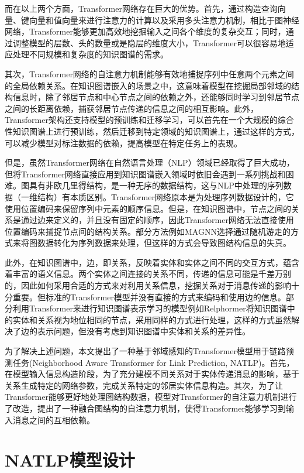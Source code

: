 而在以上两个方面，Transformer网络存在巨大的优势。首先，通过构造查询向量、键向量和值向量来进行注意力的计算以及采用多头注意力机制，相比于图神经网络，Transformer能够更加高效地挖掘输入之间各个维度的复杂交互；同时，通过调整模型的层数、头的数量或是隐层的维度大小，Transformer可以很容易地适应处理不同规模和复杂度的知识图谱的需求。

其次，Transformer网络的自注意力机制能够有效地捕捉序列中任意两个元素之间的全局依赖关系。在知识图谱嵌入的场景之中，这意味着模型在挖掘局部邻域的结构信息时，除了邻居节点和中心节点之间的依赖之外，还能够同时学习到邻居节点之间的长距离依赖，捕获邻居节点传递的信息之间的相互影响。此外，Transformer架构还支持模型的预训练和迁移学习，可以首先在一个大规模的综合性知识图谱上进行预训练，然后迁移到特定领域的知识图谱上，通过这样的方式，可以减少模型对标注数据的依赖，提高模型在特定任务上的表现。

但是，虽然Transformer网络在自然语言处理（NLP）领域已经取得了巨大成功，但将Transformer网络直接应用到知识图谱嵌入领域时依旧会遇到一系列挑战和困难。图具有非欧几里得结构，是一种无序的数据结构，这与NLP中处理的序列数据（一维结构）有本质区别。Transformer网络原本是为处理序列数据设计的，它使用位置编码来保留序列中元素的顺序信息。但是，在知识图谱中，节点之间的关系是通过边来定义的，并且没有固定的顺序，因此Transformer网络无法直接使用位置编码来捕捉节点间的结构关系。部分方法例如MAGNN选择通过随机游走的方式来将图数据转化为序列数据来处理，但这样的方式会导致图结构信息的失真。

此外，在知识图谱中，边，即关系，反映着实体和实体之间不同的交互方式，蕴含着丰富的语义信息。两个实体之间连接的关系不同，传递的信息可能是千差万别的，因此如何采用合适的方式来对利用关系信息，挖掘关系对于消息传递的影响十分重要。但标准的Transformer模型并没有直接的方式来编码和使用边的信息。部分利用Transformer来进行知识图谱表示学习的模型例如Relphormer将知识图谱中的实体和关系视为地位相同的节点，采用同样的方式进行处理，这样的方式虽然解决了边的表示问题，但没有考虑到知识图谱中实体和关系的差异性。

为了解决上述问题，本文提出了一种基于邻域感知的Transformer模型用于链路预测任务(Neighborhood Aware Transformer for Link Prediction, NATLP)。首先，在模型输入信息构造阶段，为了充分建模不同关系对于实体传递消息的影响，基于关系生成特定的网络参数，完成关系特定的邻居实体信息构造。其次，为了让Transformer能够更好地处理图结构数据，模型对Transformer的自注意力机制进行了改造，提出了一种融合图结构的自注意力机制，使得Transformer能够学习到输入消息之间的互相依赖。

\section{NATLP模型设计}

